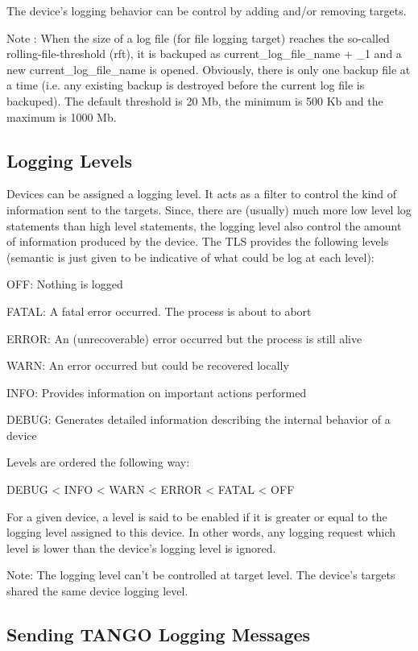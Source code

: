 The device's logging behavior can be control by adding and/or removing
targets.

Note : When the size of a log file (for file logging target) reaches
the so-called rolling-file-threshold (rft), it is backuped as \textquotedbl{}current\_log\_file\_name\textquotedbl{}
+ \textquotedbl{}\_1\textquotedbl{} and a new \textquotedbl{}current\_log\_file\_name\textquotedbl{}
is opened. Obviously, there is only one backup file at a time (i.e.
any existing backup is destroyed before the current log file is backuped).
The default threshold is 20 Mb, the minimum is 500 Kb and the maximum
is 1000 Mb.

\subsection{Logging Levels}

Devices can be assigned a logging level. It acts as a filter to control
the kind of information sent to the targets. Since, there are (usually)
much more low level log statements than high level statements, the
logging level also control the amount of information produced by the
device. The TLS provides the following levels (semantic is just given
to be indicative of what could be log at each level):

OFF: Nothing is logged

FATAL: A fatal error occurred. The process is about to abort

ERROR: An (unrecoverable) error occurred but the process is still
alive

WARN: An error occurred but could be recovered locally

INFO: Provides information on important actions performed

DEBUG: Generates detailed information describing the internal behavior
of a device

Levels are ordered the following way: \begin{center}DEBUG < INFO
< WARN < ERROR < FATAL < OFF\end{center}

For a given device, a level is said to be enabled if it is greater
or equal to the logging level assigned to this device. In other words,
any logging request which level is lower than the device's logging
level is ignored. 

Note: The logging level can't be controlled at target level. The device's
targets shared the same device logging level.

\subsection{Sending TANGO Logging Messages}

